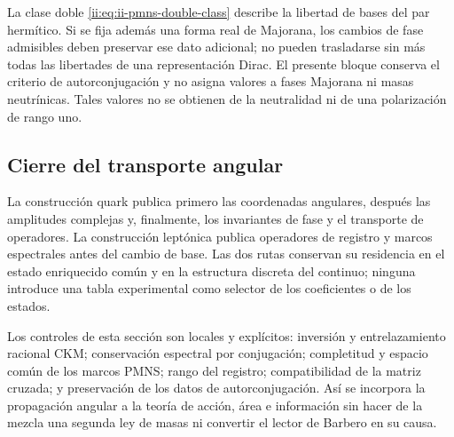 \begin{remark}
La clase doble \eqref{ii:eq:ii-pmns-double-class} describe la libertad de
bases del par hermítico. Si se fija además una forma real de Majorana,
los cambios de fase admisibles deben preservar ese dato adicional;
no pueden trasladarse sin más todas las libertades de una representación
Dirac. El presente bloque conserva el criterio de autorconjugación y
no asigna valores a fases Majorana ni masas neutrínicas. Tales valores
no se obtienen de la neutralidad ni de una polarización de rango uno.
\end{remark}

\subsection{Cierre del transporte angular}

La construcción quark publica primero las coordenadas angulares, después
las amplitudes complejas y, finalmente, los invariantes de fase y el
transporte de operadores. La construcción leptónica publica operadores de
registro y marcos espectrales antes del cambio de base. Las dos rutas
conservan su residencia en el estado enriquecido común y en la estructura
discreta del continuo; ninguna introduce una tabla experimental como
selector de los coeficientes o de los estados.

Los controles de esta sección son locales y explícitos: inversión y
entrelazamiento racional CKM; conservación espectral por conjugación;
completitud y espacio común de los marcos PMNS; rango del registro;
compatibilidad de la matriz cruzada; y preservación de los datos de
autorconjugación. Así se incorpora la propagación angular a la teoría de
acción, área e información sin hacer de la mezcla una segunda ley de
masas ni convertir el lector de Barbero en su causa.
